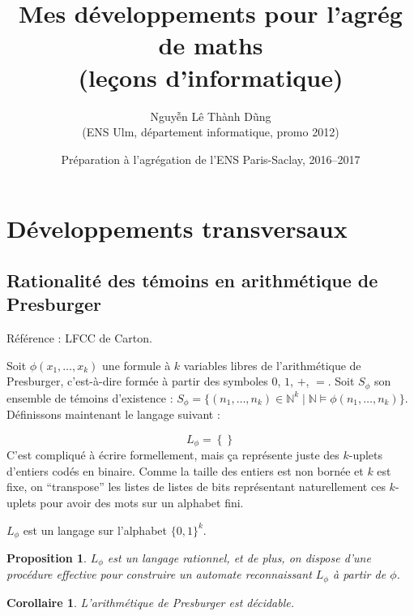 \documentclass[a4paper, 11pt]{article}
\def\N{\mathbb{N}}
\newtheorem*{proposition}{Proposition}
\newtheorem*{corollary}{Corollaire}
\begin{document}
\title{Mes développements pour l'agrég de maths\\(leçons d'informatique)}
\author{Nguyễn Lê Thành Dũng\\(ENS Ulm, département informatique, promo 2012)}
\date{Préparation à l'agrégation de l'ENS Paris-Saclay, 2016--2017}
\maketitle

\tableofcontents

\newpage

\section{Développements transversaux}

\subsection{Rationalité des témoins en arithmétique de Presburger}

Référence : LFCC de Carton.

Soit $\phi(x_1,\ldots,x_k)$ une formule à $k$ variables libres de l'arithmétique
de Presburger, c'est-à-dire formée à partir des symboles $0$, $1$, $+$, $=$.
Soit $S_\phi$ son ensemble de témoins d'existence : $S_\phi = \{ (n_1, \ldots,
n_k) \in \N^k \mid \N \models \phi(n_1, \ldots, n_k) \}$. Définissons maintenant
le langage suivant :

\[ L_\phi = \left\{  \right\}\]
C'est compliqué à écrire formellement, mais ça représente juste des $k$-uplets
d'entiers codés en binaire. Comme la taille des entiers est non bornée et $k$
est fixe, on \enquote{transpose} les listes de listes de bits représentant
naturellement ces $k$-uplets pour avoir des mots sur un alphabet fini.

$L_\phi$ est un langage sur l'alphabet $\{0,1\}^k$.

\begin{proposition}
  $L_\phi$ est un langage rationnel, et de plus, on dispose d'une procédure
  effective pour construire un automate reconnaissant $L_\phi$ à partir de
  $\phi$.
\end{proposition}

\begin{corollary}
  L'arithmétique de Presburger est décidable.
\end{corollary}

\newpage
\end{document}
